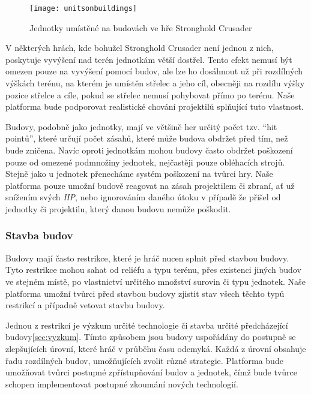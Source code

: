 \begin{figure}[h]	
	\centering
	\texttt{[image: unitsonbuildings]}
	\caption{Jednotky umístěné na budovách ve hře Stronghold Crusader}
	\label{fig:unitsonbuildings}
\end{figure}

V některých hrách, kde bohužel Stronghold Crusader není jednou z nich, poskytuje vyvýšení nad terén jednotkám větší dostřel. Tento efekt nemusí být omezen pouze na vyvýšení pomocí budov, ale lze ho dosáhnout už při rozdílných výškách terénu, na kterém je umístěn střelec a jeho cíl, obecněji na rozdílu výšky pozice střelce a cíle, pokud se střelec nemusí pohybovat přímo po terénu. Naše platforma bude podporovat realistické chování projektilů splňující tuto vlastnost. 

\done
{}
\done
{}

Budovy, podobně jako jednotky, mají ve většině her určitý počet tzv. ``hit pointů'', které určují počet zásahů, které může budova obdržet před tím, než bude zničena. Navíc oproti jednotkám mohou budovy často obdržet poškození pouze od omezené podmnožiny jednotek, nejčastěji pouze obléhacích strojů. Stejně jako u jednotek přenecháme systém poškození na tvůrci hry. Naše platforma pouze umožní budově reagovat na zásah projektilem či zbraní, ať už snížením svých \textit{HP}, nebo ignorováním daného útoku v případě že přišel od jednotky či projektilu, který danou budovu nemůže poškodit.


\subsubsection{Stavba budov}
\done
{}
Budovy mají často restrikce, které je hráč nucen splnit před stavbou budovy. Tyto restrikce mohou sahat od reliéfu a typu terénu, přes existenci jiných budov ve stejném místě, po vlastnictví určitého množství surovin či typu jednotek. Naše platforma umožní tvůrci před stavbou budovy zjistit stav všech těchto typů restrikcí a případně vetovat stavbu budovy. 

Jednou z restrikcí je výzkum určité technologie či stavba určité předcházející budovy\ref{sec:vyzkum}. Tímto způsobem jsou budovy uspořádány do postupně se zlepšujících úrovní, které hráč v průběhu času odemyká. Každá z úrovní obsahuje řadu rozdílných budov, umožňujících zvolit různé strategie. Platforma bude umožňovat tvůrci postupné zpřístupňování budov a jednotek, čímž bude tvůrce schopen implementovat postupné zkoumání nových technologií.

